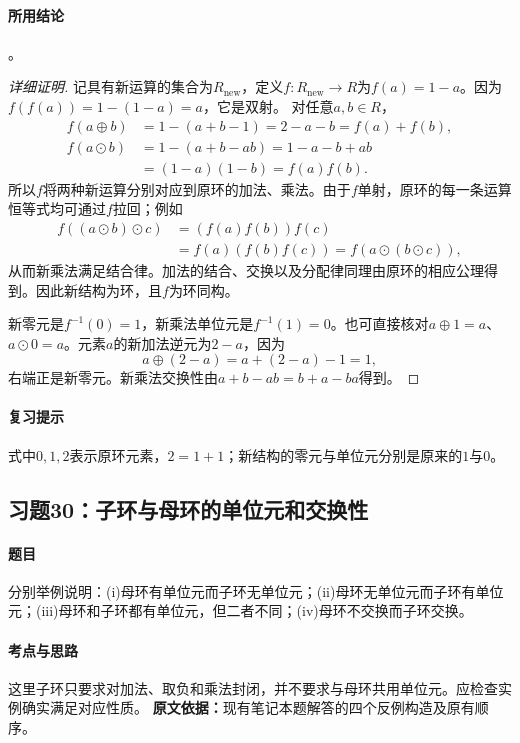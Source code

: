 \paragraph{所用结论}
。
\begin{proof}[详细证明]
记具有新运算的集合为$R_{\mathrm{new}}$，定义$f:R_{\mathrm{new}}\to R$为$f(a)=1-a$。因为$f(f(a))=1-(1-a)=a$，它是双射。
对任意$a,b\in R$，
\begin{align*}
f(a\oplus b)&=1-(a+b-1)=2-a-b=f(a)+f(b),\\
f(a\odot b)&=1-(a+b-ab)=1-a-b+ab\\
&=(1-a)(1-b)=f(a)f(b).
\end{align*}
所以$f$将两种新运算分别对应到原环的加法、乘法。由于$f$单射，原环的每一条运算恒等式均可通过$f$拉回；例如
\begin{align*}
f((a\odot b)\odot c)&=(f(a)f(b))f(c)\\
&=f(a)(f(b)f(c))=f(a\odot(b\odot c)),
\end{align*}
从而新乘法满足结合律。加法的结合、交换以及分配律同理由原环的相应公理得到。因此新结构为环，且$f$为环同构。

新零元是$f^{-1}(0)=1$，新乘法单位元是$f^{-1}(1)=0$。也可直接核对$a\oplus1=a$、$a\odot0=a$。元素$a$的新加法逆元为$2-a$，因为
\[
a\oplus(2-a)=a+(2-a)-1=1,
\]
右端正是新零元。新乘法交换性由$a+b-ab=b+a-ba$得到。
\end{proof}
\paragraph{复习提示}
式中$0,1,2$表示原环元素，$2=1+1$；新结构的零元与单位元分别是原来的$1$与$0$。

\subsection{习题30：子环与母环的单位元和交换性}
\paragraph{题目}
分别举例说明：(i)母环有单位元而子环无单位元；(ii)母环无单位元而子环有单位元；(iii)母环和子环都有单位元，但二者不同；(iv)母环不交换而子环交换。
\paragraph{考点与思路}
这里子环只要求对加法、取负和乘法封闭，并不要求与母环共用单位元。应检查实例确实满足对应性质。
\textbf{原文依据：}现有笔记本题解答的四个反例构造及原有顺序。
